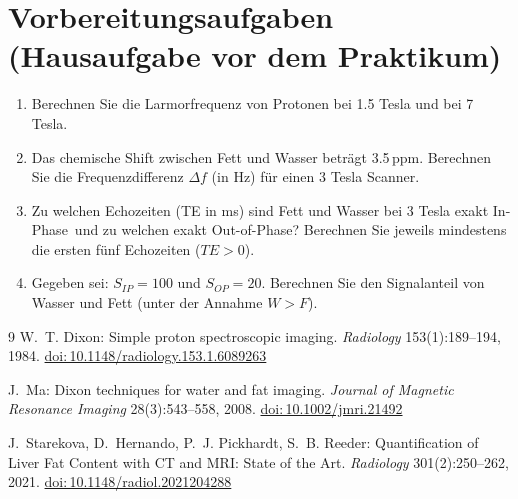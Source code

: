 \documentclass[a4paper,11pt]{article}
\newcommand{\TE}{\mathit{TE}}
\newcommand{\IP}{_{\mathit{IP}}}
\newcommand{\OP}{_{\mathit{OP}}}
\newcommand{\doi}[1]{\href{https://doi.org/#1}{doi:\,#1}}
\begin{document}
\section{Vorbereitungsaufgaben (Hausaufgabe vor dem Praktikum)}\label{sec:aufgaben}
\begin{enumerate}
\item Berechnen Sie die Larmorfrequenz von Protonen bei 1.5 Tesla und bei 7 Tesla.
\item Das chemische Shift zwischen Fett und Wasser beträgt 3.5\,ppm. Berechnen Sie die Frequenzdifferenz $\Delta f$ (in Hz) für einen 3 Tesla Scanner.
\item Zu welchen Echozeiten (TE in ms) sind Fett und Wasser bei 3 Tesla exakt \glqq In-Phase\grqq\ und zu welchen exakt \glqq Out-of-Phase\grqq? Berechnen Sie jeweils mindestens die ersten fünf Echozeiten ($\TE > 0$).
\item Gegeben sei: $S\IP = 100$ und $S\OP = 20$. Berechnen Sie den Signalanteil von Wasser und Fett (unter der Annahme $W > F$).
\end{enumerate}

\begingroup\raggedright
\begin{thebibliography}{9}
W.~T. Dixon: Simple proton spectroscopic imaging. \emph{Radiology} 153(1):189--194, 1984.
\doi{10.1148/radiology.153.1.6089263}

J.~Ma: Dixon techniques for water and fat imaging. \emph{Journal of Magnetic Resonance Imaging} 28(3):543--558, 2008.
\doi{10.1002/jmri.21492}

J.~Starekova, D.~Hernando, P.~J. Pickhardt, S.~B. Reeder: Quantification of Liver Fat Content with CT and MRI: State of the Art. \emph{Radiology} 301(2):250--262, 2021.
\doi{10.1148/radiol.2021204288}
\end{thebibliography}
\endgroup
\end{document}
